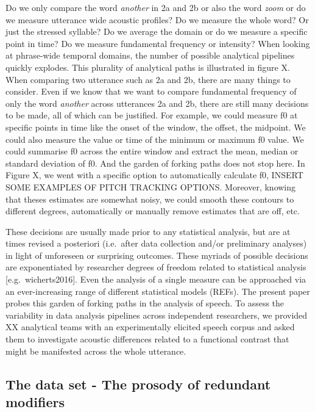 \documentclass[
  12pt,
]{article}
\begin{document}
Do we only compare the word \emph{another} in 2a and 2b or also the word \emph{zoom} or do we measure utterance wide acoustic profiles? Do we measure the whole word? Or just the stressed syllable?
Do we average the domain or do we measure a specific point in time?
Do we measure fundamental frequency or intensity?
When looking at phrase-wide temporal domains, the number of possible analytical pipelines quickly explodes.
This plurality of analytical paths is illustrated in figure X.
When comparing two utterance such as 2a and 2b, there are many things to consider.
Even if we know that we want to compare fundamental frequency of only the word \emph{another} across utterances 2a and 2b, there are still many decisions to be made, all of which can be justified.
For example, we could measure f0 at specific points in time like the onset of the window, the offset, the midpoint.
We could also measure the value or time of the minimum or maximum f0 value.
We could summarise f0 across the entire window and extract the mean, median or standard deviation of f0.
And the garden of forking paths does not stop here.
In Figure X, we went with a specific option to automatically calculate f0, INSERT SOME EXAMPLES OF PITCH TRACKING OPTIONS.
Moreover, knowing that theses estimates are somewhat noisy, we could smooth these contours to different degrees, automatically or manually remove estimates that are off, etc.

These decisions are usually made prior to any statistical analysis, but are at times revised a posteriori (i.e.~after data collection and/or preliminary analyses) in light of unforeseen or surprising outcomes.
These myriads of possible decisions are exponentiated by researcher degrees of freedom related to statistical analysis {[}e.g.~wicherts2016{]}.
Even the analysis of a single measure can be approached via an ever-increasing range of different statistical models (REFs).
The present paper probes this garden of forking paths in the analysis of speech.
To assess the variability in data analysis pipelines across independent researchers, we provided XX analytical teams with an experimentally elicited speech corpus and asked them to investigate acoustic differences related to a functional contrast that might be manifested across the whole utterance.

\hypertarget{the-data-set---the-prosody-of-redundant-modifiers}{%
\subsection{The data set - The prosody of redundant modifiers}\label{the-data-set---the-prosody-of-redundant-modifiers}}
\end{document}

